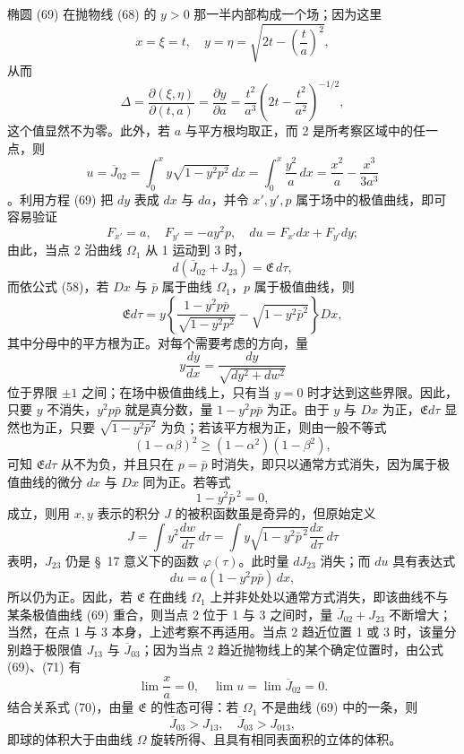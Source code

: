 \documentclass[11pt,a4paper,leqno]{article}
\begin{document}
椭圆 (69) 在抛物线 (68) 的 $y>0$ 那一半内部构成一个场；因为这里
\[
x=\xi=t,\quad
y=\eta=\sqrt{2t-\left(\frac{t}{a}\right)^2},
\]
从而
\[
\Delta=\frac{\partial(\xi,\eta)}{\partial(t,a)}
=\frac{\partial y}{\partial a}
=
\frac{t^2}{a^3}\left(2t-\frac{t^2}{a^2}\right)^{-1/2},
\]
这个值显然不为零。此外，若 $a$ 与平方根均取正，而 2 是所考察区域中的任一点，则
\begin{equation}\tag{71}
u=\overline{J}_{02}
=
\int_0^x y\sqrt{1-y^2p^2}\,dx
=
\int_0^x\frac{y^2}{a}\,dx
=
\frac{x^2}{a}-\frac{x^3}{3a^3}
\end{equation}
。利用方程 (69) 把 $dy$ 表成 $dx$ 与 $da$，并令 $x',y',p$ 属于场中的极值曲线，即可容易验证
\[
F_{x'}=a,\quad F_{y'}=-ay^2p,\quad du=F_{x'}dx+F_{y'}dy;
\]
由此，当点 2 沿曲线 $\Omega_1$ 从 1 运动到 3 时，
\[
d(\overline{J}_{02}+J_{23})=\mathfrak{E}\,d\tau,
\]
而依公式 (58)，若 $D x$ 与 $\bar{p}$ 属于曲线 $\Omega_1$，$p$ 属于极值曲线，则
\[
\mathfrak{E}d\tau
=
y\left\{
\frac{1-y^2p\bar{p}}{\sqrt{1-y^2p^2}}
-
\sqrt{1-y^2\bar{p}^2}
\right\}D x,
\]
其中分母中的平方根为正。对每个需要考虑的方向，量
\[
y\frac{dy}{dx}
=
\frac{dy}{\sqrt{dy^2+dw^2}}
\]
位于界限 $\pm1$ 之间；在场中极值曲线上，只有当 $y=0$ 时才达到这些界限。因此，只要 $y$ 不消失，$y^2p\bar{p}$ 就是真分数，量 $1-y^2p\bar{p}$ 为正。由于 $y$ 与 $D x$ 为正，$\mathfrak{E}d\tau$ 显然也为正，只要 $\sqrt{1-y^2\bar{p}^2}$ 为负；若该平方根为正，则由一般不等式
\[
(1-\alpha\beta)^2\geq(1-\alpha^2)(1-\beta^2),
\]
可知 $\mathfrak{E}d\tau$ 从不为负，并且只在 $p=\bar{p}$ 时消失，即只以通常方式消失，因为属于极值曲线的微分 $dx$ 与 $D x$ 同为正。若等式
\[
1-y^2\bar{p}^{\,2}=0,
\]
成立，则用 $x,y$ 表示的积分 $J$ 的被积函数虽是奇异的，但原始定义
\[
J=\int y^2\frac{dw}{d\tau}\,d\tau
=
\int y\sqrt{1-y^2\bar{p}^{\,2}}\frac{dx}{d\tau}\,d\tau
\]
表明，$J_{23}$ 仍是 \S~17 意义下的函数 $\varphi(\tau)$。此时量 $dJ_{23}$ 消失；而 $du$ 具有表达式
\[
du=a(1-y^2p\bar{p})\,dx,
\]
所以仍为正。因此，若 $\mathfrak{E}$ 在曲线 $\Omega_1$ 上并非处处以通常方式消失，即该曲线不与某条极值曲线 (69) 重合，则当点 2 位于 1 与 3 之间时，量 $\overline{J}_{02}+J_{23}$ 不断增大；当然，在点 1 与 3 本身，上述考察不再适用。当点 2 趋近位置 1 或 3 时，该量分别趋于极限值 $J_{13}$ 与 $\overline{J}_{03}$；因为当点 2 趋近抛物线上的某个确定位置时，由公式 (69)、(71) 有
\[
\lim\frac{x}{a}=0,\quad \lim u=\lim\overline{J}_{02}=0.
\]
结合关系式 (70)，由量 $\mathfrak{E}$ 的性态可得：若 $\Omega_1$ 不是曲线 (69) 中的一条，则
\[
\overline{J}_{03}>J_{13},\quad
\overline{J}_{03}>J_{013},
\]
即球的体积大于由曲线 $\Omega$ 旋转所得、且具有相同表面积的立体的体积。
\end{document}
